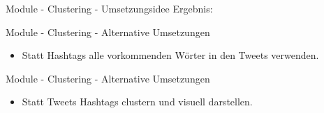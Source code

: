 \begin{frame}{Module - Clustering - Umsetzungsidee}
Ergebnis: 


\end{frame}


\begin{frame}{Module - Clustering - Alternative Umsetzungen}
\begin{itemize}
    \item Statt Hashtags alle vorkommenden Wörter in den Tweets verwenden. 
\end{itemize}
  
\end{frame}


\begin{frame}{Module - Clustering - Alternative Umsetzungen}
\begin{itemize}
    \item Statt Tweets Hashtags clustern und visuell darstellen.
\end{itemize}
 
\end{frame}
